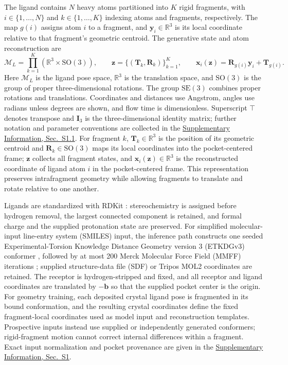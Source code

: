 \documentclass{article}
\newcommand{\R}{\mathbb{R}}
\newcommand{\SO}{\mathrm{SO}}
\newcommand{\SE}{\mathrm{SE}}
\newcommand{\citep}[1]{\cite{#1}}
\newcommand{\sisection}[1]{\href{SI.pdf}{Supplementary Information, Sec.~#1}}
\begin{document}
The ligand contains \(N\) heavy atoms partitioned into \(K\) rigid fragments, with \(i\in\{1,\ldots,N\}\) and \(k\in\{1,\ldots,K\}\) indexing atoms and fragments, respectively.
The map \(g(i)\) assigns atom \(i\) to a fragment, and \(\mathbf{y}_i\in\R^3\) is its local coordinate relative to that fragment's geometric centroid.
The generative state and atom reconstruction are
\begin{equation}
    \mathcal{M}_{L}
    =
    \prod_{k=1}^{K}\left(\R^3\times\SO(3)\right),
    \qquad
    \mathbf{z}
    =
    \{(\mathbf{T}_k,\mathbf{R}_k)\}_{k=1}^{K},
    \qquad
    \mathbf{x}_i(\mathbf{z})
    =
    \mathbf{R}_{g(i)}\mathbf{y}_i+\mathbf{T}_{g(i)}.
    \label{eq:pose_manifold}
\end{equation}
Here \(\mathcal{M}_{L}\) is the ligand pose space, \(\R^3\) is the translation space, and \(\SO(3)\) is the group of proper three-dimensional rotations.
The group \(\SE(3)\) combines proper rotations and translations. Coordinates and distances use Angstrom, angles use radians unless degrees are shown, and flow time is dimensionless. Superscript \(\top\) denotes transpose and \(\mathbf I_3\) is the three-dimensional identity matrix; further notation and parameter conventions are collected in the \sisection{S1.1}.
For fragment \(k\), \(\mathbf{T}_k\in\R^3\) is the position of its geometric centroid and \(\mathbf{R}_k\in\SO(3)\) maps its local coordinates into the pocket-centered frame; \(\mathbf{z}\) collects all fragment states, and \(\mathbf{x}_i(\mathbf{z})\in\R^3\) is the reconstructed coordinate of ligand atom \(i\) in the pocket-centered frame.
This representation preserves intrafragment geometry while allowing fragments to translate and rotate relative to one another.

Ligands are standardized with RDKit \citep{landrum2024rdkit}: stereochemistry is assigned before hydrogen removal, the largest connected component is retained, and formal charge and the supplied protonation state are preserved.
For simplified molecular-input line-entry system (SMILES) input, the inference path constructs one seeded Experimental-Torsion Knowledge Distance Geometry version 3 (ETKDGv3) conformer \citep{wang2020etkdgv3}, followed by at most 200 Merck Molecular Force Field (MMFF) iterations \citep{halgren1996mmff}; supplied structure-data file (SDF) or Tripos MOL2 coordinates are retained.
The receptor is hydrogen-stripped and fixed, and all receptor and ligand coordinates are translated by \(-\mathbf{b}\) so that the supplied pocket center is the origin.
For geometry training, each deposited crystal ligand pose is fragmented in its bound conformation, and the resulting crystal coordinates define the fixed fragment-local coordinates used as model input and reconstruction templates.
Prospective inputs instead use supplied or independently generated conformers; rigid-fragment motion cannot correct internal differences within a fragment.
Exact input normalization and pocket provenance are given in the \sisection{S1}.
\end{document}
